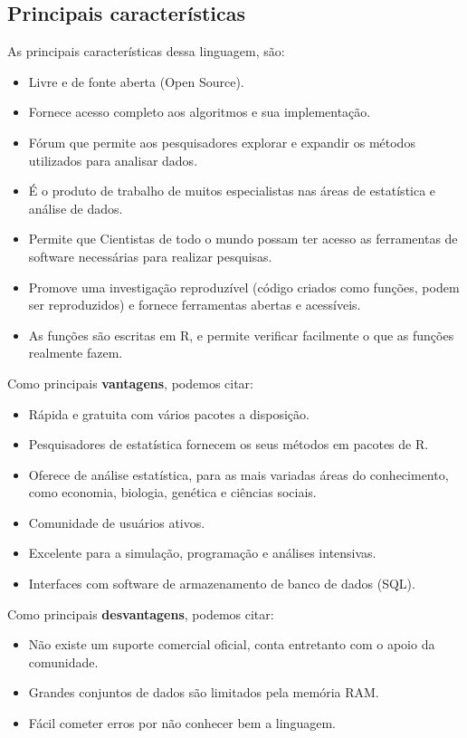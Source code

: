 \documentclass[a4paper,11pt]{article}
\begin{document}
\subsection{Principais características}
As principais características dessa linguagem, são:
\begin{itemize}[noitemsep]
  \item Livre e de fonte aberta (Open Source). 
  \item Fornece acesso completo aos algoritmos e sua implementação. 
  \item Fórum que permite aos pesquisadores explorar e expandir os métodos utilizados para analisar dados.
  \item É o produto de trabalho de muitos especialistas nas áreas de estatística e análise de dados.
  \item Permite que Cientistas de todo o mundo possam ter acesso as ferramentas de software necessárias para realizar pesquisas.
  \item Promove uma investigação reproduzível (código criados como funções, podem ser reproduzidos) e fornece ferramentas abertas e acessíveis.
  \item As funções são escritas em R, e permite verificar facilmente o que as funções realmente fazem.
\end{itemize}

Como principais \textbf{vantagens}, podemos citar:
\begin{itemize}[noitemsep]
  \item Rápida e gratuita com vários pacotes a disposição.
  \item Pesquisadores de estatística fornecem os seus métodos em pacotes de R.
  \item Oferece de análise estatística, para as mais variadas áreas do conhecimento, como economia, biologia, genética e ciências sociais.
  \item Comunidade de usuários ativos.
  \item Excelente para a simulação, programação e análises intensivas.
  \item Interfaces com software de armazenamento de banco de dados (SQL).
\end{itemize}

Como principais \textbf{desvantagens}, podemos citar:
\begin{itemize}[noitemsep]
  \item Não existe um suporte comercial oficial, conta entretanto com o apoio da comunidade.
  \item Grandes conjuntos de dados são limitados pela memória RAM.
  \item Fácil cometer erros por não conhecer bem a linguagem.
\end{itemize}
\end{document}
